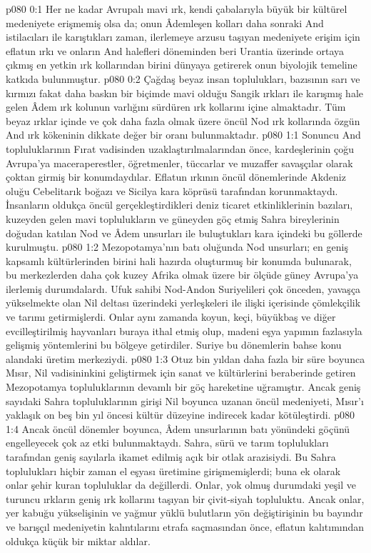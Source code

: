 \vs p080 0:1 Her ne kadar Avrupalı mavi ırk, kendi çabalarıyla büyük bir kültürel medeniyete erişmemiş olsa da; onun Âdemleşen kolları daha sonraki And istilacıları ile karıştıkları zaman, ilerlemeye arzusu taşıyan medeniyete erişim için eflatun ırkı ve onların And halefleri döneminden beri Urantia üzerinde ortaya çıkmış en yetkin ırk kollarından birini dünyaya getirerek onun biyolojik temeline katkıda bulunmuştur.
\vs p080 0:2 Çağdaş beyaz insan toplulukları, bazısının sarı ve kırmızı fakat daha baskın bir biçimde mavi olduğu Sangik ırkları ile karışmış hale gelen Âdem ırk kolunun varlığını sürdüren ırk kollarını içine almaktadır. Tüm beyaz ırklar içinde ve çok daha fazla olmak üzere öncül Nod ırk kollarında özgün And ırk kökeninin dikkate değer bir oranı bulunmaktadır.
\vs p080 1:1 Sonuncu And topluluklarının Fırat vadisinden uzaklaştırılmalarından önce, kardeşlerinin çoğu Avrupa’ya maceraperestler, öğretmenler, tüccarlar ve muzaffer savaşçılar olarak çoktan girmiş bir konumdaydılar. Eflatun ırkının öncül dönemlerinde Akdeniz oluğu Cebelitarık boğazı ve Sicilya kara köprüsü tarafından korunmaktaydı. İnsanların oldukça öncül gerçekleştirdikleri deniz ticaret etkinliklerinin bazıları, kuzeyden gelen mavi toplulukların ve güneyden göç etmiş Sahra bireylerinin doğudan katılan Nod ve Âdem unsurları ile buluştukları kara içindeki bu göllerde kurulmuştu.
\vs p080 1:2 Mezopotamya’nın batı oluğunda Nod unsurları; en geniş kapsamlı kültürlerinden birini hali hazırda oluşturmuş bir konumda bulunarak, bu merkezlerden daha çok kuzey Afrika olmak üzere bir ölçüde güney Avrupa’ya ilerlemiş durumdalardı. Ufuk sahibi Nod\hyp{}Andon Suriyelileri çok önceden, yavaşça yükselmekte olan Nil deltası üzerindeki yerleşkeleri ile ilişki içerisinde çömlekçilik ve tarımı getirmişlerdi. Onlar aynı zamanda koyun, keçi, büyükbaş ve diğer evcilleştirilmiş hayvanları buraya ithal etmiş olup, madeni eşya yapımın fazlasıyla gelişmiş yöntemlerini bu bölgeye getirdiler. Suriye bu dönemlerin bahse konu alandaki üretim merkeziydi.
\vs p080 1:3 Otuz bin yıldan daha fazla bir süre boyunca Mısır, Nil vadisininkini geliştirmek için sanat ve kültürlerini beraberinde getiren Mezopotamya topluluklarının devamlı bir göç hareketine uğramıştır. Ancak geniş sayıdaki Sahra topluluklarının girişi Nil boyunca uzanan öncül medeniyeti, Mısır’ı yaklaşık on beş bin yıl öncesi kültür düzeyine indirecek kadar kötüleştirdi.
\vs p080 1:4 Ancak öncül dönemler boyunca, Âdem unsurlarının batı yönündeki göçünü engelleyecek çok az etki bulunmaktaydı. Sahra, sürü ve tarım toplulukları tarafından geniş sayılarla ikamet edilmiş açık bir otlak arazisiydi. Bu Sahra toplulukları hiçbir zaman el eşyası üretimine girişmemişlerdi; buna ek olarak onlar şehir kuran topluluklar da değillerdi. Onlar, yok olmuş durumdaki yeşil ve turuncu ırkların geniş ırk kollarını taşıyan bir çivit\hyp{}siyah topluluktu. Ancak onlar, yer kabuğu yükselişinin ve yağmur yüklü bulutların yön değiştirişinin bu bayındır ve barışçıl medeniyetin kalıntılarını etrafa saçmasından önce, eflatun kalıtımından oldukça küçük bir miktar aldılar.

